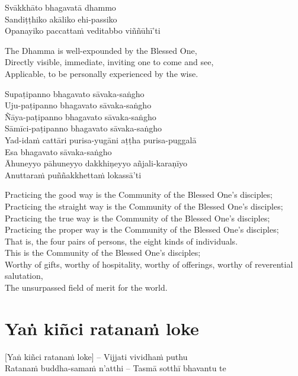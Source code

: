 Svākkhāto bhagavatā dhammo\\
Sandiṭṭhiko akāliko ehi-passiko\\
Opanayiko paccattaṁ veditabbo viññūhī'ti

\begin{english}
  The Dhamma is well-expounded by the Blessed One,\\
  Directly visible, immediate, inviting one to come and see,\\
  Applicable, to be personally experienced by the wise.
\end{english}

Supaṭipanno bhagavato sāvaka-saṅgho\\
Uju-paṭipanno bhagavato sāvaka-saṅgho\\
Ñāya-paṭipanno bhagavato sāvaka-saṅgho\\
Sāmīci-paṭipanno bhagavato sāvaka-saṅgho\\
Yad-idaṁ cattāri purisa-yugāni aṭṭha purisa-puggalā\\
Esa bhagavato sāvaka-saṅgho\\
Āhuneyyo pāhuneyyo dakkhiṇeyyo añjali-karaṇīyo\\
Anuttaraṁ puññakkhettaṁ lokassā'ti

\begin{english}
  Practicing the good way is the Community of the Blessed One's disciples;\\
  Practicing the straight way is the Community of the Blessed One's disciples;\\
  Practicing the true way is the Community of the Blessed One's disciples;\\
  Practicing the proper way is the Community of the Blessed One's disciples;\\
  That is, the four pairs of persons, the eight kinds of individuals.\\
  This is the Community of the Blessed One's disciples;\\
  Worthy of gifts, worthy of hospitality, worthy of offerings, worthy of reverential salutation,\\
  The unsurpassed field of merit for the world.
\end{english}

\suttaRef{[SN 11.3]}

\section{Yaṅ kiñci ratanaṁ loke}
\label{yan-kinci-ratanam-loke}
[Yaṅ kiñci ratanaṁ loke] – Vijjati vividhaṁ puthu\\
Ratanaṁ buddha-samaṁ n'atthi – Tasmā sotthī bhavantu te

